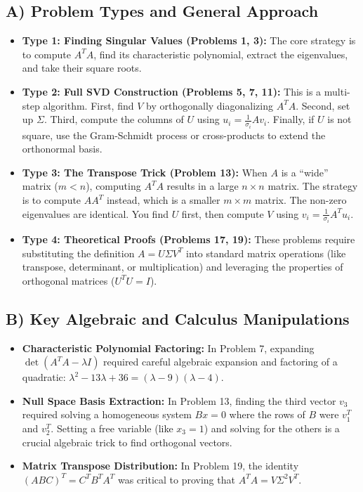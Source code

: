 \documentclass[11pt, letterpaper]{article}
\theoremstyle{definition}
\theoremstyle{remark}
\begin{document}
\subsection{A) Problem Types and General Approach}
\begin{itemize}
    \item \textbf{Type 1: Finding Singular Values (Problems 1, 3):} The core strategy is to compute $A^TA$, find its characteristic polynomial, extract the eigenvalues, and take their square roots. 
    \item \textbf{Type 2: Full SVD Construction (Problems 5, 7, 11):} This is a multi-step algorithm. First, find $V$ by orthogonally diagonalizing $A^TA$. Second, set up $\Sigma$. Third, compute the columns of $U$ using $u_i = \frac{1}{\sigma_i}Av_i$. Finally, if $U$ is not square, use the Gram-Schmidt process or cross-products to extend the orthonormal basis.
    \item \textbf{Type 3: The Transpose Trick (Problem 13):} When $A$ is a ``wide'' matrix ($m < n$), computing $A^TA$ results in a large $n \times n$ matrix. The strategy is to compute $AA^T$ instead, which is a smaller $m \times m$ matrix. The non-zero eigenvalues are identical. You find $U$ first, then compute $V$ using $v_i = \frac{1}{\sigma_i}A^T u_i$.
    \item \textbf{Type 4: Theoretical Proofs (Problems 17, 19):} These problems require substituting the definition $A = U \Sigma V^T$ into standard matrix operations (like transpose, determinant, or multiplication) and leveraging the properties of orthogonal matrices ($U^TU = I$).
\end{itemize}

\subsection{B) Key Algebraic and Calculus Manipulations}
\begin{itemize}
    \item \textbf{Characteristic Polynomial Factoring:} In Problem 7, expanding $\det(A^TA - \lambda I)$ required careful algebraic expansion and factoring of a quadratic: $\lambda^2 - 13\lambda + 36 = (\lambda - 9)(\lambda - 4)$.
    \item \textbf{Null Space Basis Extraction:} In Problem 13, finding the third vector $v_3$ required solving a homogeneous system $Bx = 0$ where the rows of $B$ were $v_1^T$ and $v_2^T$. Setting a free variable (like $x_3 = 1$) and solving for the others is a crucial algebraic trick to find orthogonal vectors.
    \item \textbf{Matrix Transpose Distribution:} In Problem 19, the identity $(ABC)^T = C^T B^T A^T$ was critical to proving that $A^TA = V \Sigma^2 V^T$.
\end{itemize}
\end{document}
